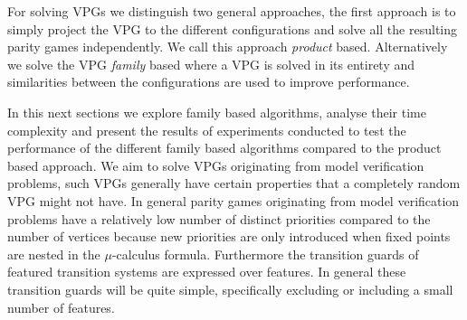 For solving VPGs we distinguish two general approaches, the first approach is to simply project the VPG to the different configurations and solve all the resulting parity games independently. We call this approach \textit{product} based. Alternatively we solve the VPG \textit{family} based where a VPG is solved in its entirety and similarities between the configurations are used to improve performance. 

In this next sections we explore family based algorithms, analyse their time complexity and present the results of experiments conducted to test the performance of the different family based algorithms compared to the product based approach. We aim to solve VPGs originating from model verification problems, such VPGs generally have certain properties that a completely random VPG might not have. In general parity games originating from model verification problems have a relatively low number of distinct priorities compared to the number of vertices because new priorities are only introduced when fixed points are nested in the $\mu$-calculus formula. Furthermore the transition guards of featured transition systems are expressed over features. In general these transition guards will be quite simple, specifically excluding or including a small number of features.
